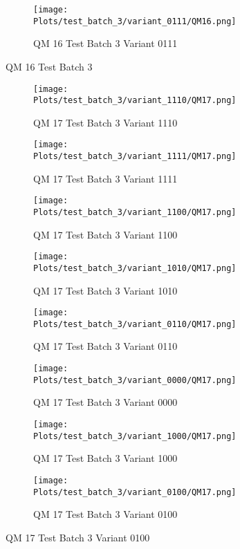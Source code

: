 \documentclass{DissertateFigs}
\begin{document}
\begin{figure}[t!]
\medskip

    \begin{subfigure}{0.33\textwidth}
    \texttt{[image: Plots/test\_batch\_3/variant\_0111/QM16.png]}
    \caption{QM 16 Test Batch 3 Variant 0111}
    \end{subfigure}
\caption{QM 16 Test Batch 3}
    \end{figure}
\clearpage
\begin{figure}[t!]
    \begin{subfigure}{0.43\textwidth}
    \texttt{[image: Plots/test\_batch\_3/variant\_1110/QM17.png]}
    \caption{QM 17 Test Batch 3 Variant 1110}
    \end{subfigure}
    \begin{subfigure}{0.43\textwidth}
    \texttt{[image: Plots/test\_batch\_3/variant\_1111/QM17.png]}
    \caption{QM 17 Test Batch 3 Variant 1111}
    \end{subfigure}

\medskip

    \begin{subfigure}{0.43\textwidth}
    \texttt{[image: Plots/test\_batch\_3/variant\_1100/QM17.png]}
    \caption{QM 17 Test Batch 3 Variant 1100}
    \end{subfigure}
    \begin{subfigure}{0.43\textwidth}
    \texttt{[image: Plots/test\_batch\_3/variant\_1010/QM17.png]}
    \caption{QM 17 Test Batch 3 Variant 1010}
    \end{subfigure}

\medskip

    \begin{subfigure}{0.43\textwidth}
    \texttt{[image: Plots/test\_batch\_3/variant\_0110/QM17.png]}
    \caption{QM 17 Test Batch 3 Variant 0110}
    \end{subfigure}
    \begin{subfigure}{0.43\textwidth}
    \texttt{[image: Plots/test\_batch\_3/variant\_0000/QM17.png]}
    \caption{QM 17 Test Batch 3 Variant 0000}
    \end{subfigure}

\medskip

    \begin{subfigure}{0.43\textwidth}
    \texttt{[image: Plots/test\_batch\_3/variant\_1000/QM17.png]}
    \caption{QM 17 Test Batch 3 Variant 1000}
    \end{subfigure}
    \begin{subfigure}{0.43\textwidth}
    \texttt{[image: Plots/test\_batch\_3/variant\_0100/QM17.png]}
    \caption{QM 17 Test Batch 3 Variant 0100}
    \end{subfigure}


\end{figure}
\end{document}

